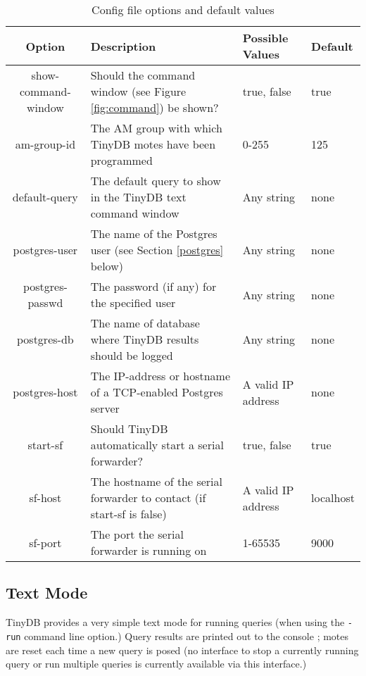 \documentclass[11pt]{article}
\begin{document}
\begin{table*}[tb]
\noindent
\tiny
\begin{tabular}{|c|l|l|l|}
\hline
Option & Description & Possible Values & Default \\
\hline\hline
show-command-window & Should the command window (see Figure \ref{fig:command}) be shown? & true, false & true \\
am-group-id & The AM group with which TinyDB motes have been programmed & 0-255 & 125 \\
default-query & The default query to show in the TinyDB text command window & Any string & none \\
postgres-user & The name of the Postgres user (see Section \ref{postgres} below) & Any string & none \\
postgres-passwd & The password (if any) for the specified user  & Any string & none \\
postgres-db & The name of database where TinyDB results should be logged  & Any string & none \\
postgres-host & The IP-address or hostname of a TCP-enabled Postgres server & A valid IP address & none \\
start-sf & Should TinyDB automatically start a serial forwarder? & true, false & true \\
sf-host & The hostname of the serial forwarder to contact (if start-sf is false) & A valid IP address & localhost\\
sf-port & The port the serial forwarder is running on & 1-65535 & 9000 \\
\hline

\end{tabular}
\caption{Config file options and default values}\label{tab:config}
\normalsize
\end{table*}

\subsection{Text Mode}\label{sec:textmode}

TinyDB provides a very simple text mode  for running queries (when using the {\tt -run} command line option.)
Query results are printed out to the console ;  motes are reset each time a new query is posed (no interface
to stop a currently running query or run multiple queries is currently available via this interface.)
\end{document}
